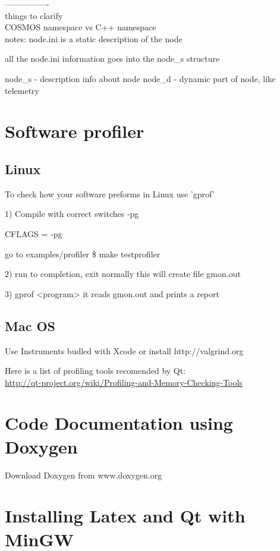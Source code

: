 ----------------\\
things to clarify\\
COSMOS namespace vs C++ namespace\\


notes:
node.ini
is a static description of the node


all the node.ini information goes into the node\_s structure

node\_s - description info about node
node\_d - dynamic part of node, like telemetry

\section{Software profiler}

\subsection{Linux}
To check how your software preforms in Linux use 'gprof'

1) Compile with correct switches 
-pg

CFLAGS = -pg 

go to examples/profiler
\$ make testprofiler

2) run to completion, exit normally 
this will create file gmon.out

3) gprof <program>
it reads gmon.out and prints a report

\subsection{Mac OS}
Use Instruments budled with Xcode
or install
http://valgrind.org

Here is a list of profiling tools recomended by Qt: \\
\url{http://qt-project.org/wiki/Profiling-and-Memory-Checking-Tools}

\section{Code Documentation using Doxygen}
Download Doxygen from www.doxygen.org


\section{Installing Latex and Qt with MinGW}

